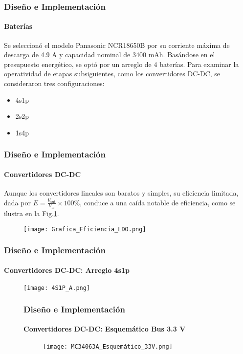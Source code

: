 \begin{frame}
    \frametitle{Diseño e Implementación}
    \framesubtitle{Baterías}
    Se seleccionó el modelo Panasonic NCR18650B por su corriente máxima de descarga de 4.9 A y capacidad nominal de 3400 mAh. Basándose en el presupuesto energético, se optó por un arreglo de 4 baterías. Para examinar la operatividad de etapas subsiguientes, como los convertidores DC-DC, se consideraron tres configuraciones: 
    \begin{itemize}
        \item 4s1p
        \item 2s2p
        \item 1s4p
    \end{itemize}
\end{frame}

\begin{frame}
    \frametitle{Diseño e Implementación}
    \framesubtitle{Convertidores DC-DC}
    Aunque los convertidores lineales son baratos y simples, su eficiencia limitada, dada por $E = \frac{V_{\text{out}}}{V_{\text{in}}} \times 100\%$, conduce a una caída notable de eficiencia, como se ilustra en la Fig.\ref{fig:LDOE}.
    \begin{figure}[H]
        \centering
        \texttt{[image: Grafica\_Eficiencia\_LDO.png]} %
        \label{fig:LDOE}
    \end{figure}
\end{frame}





\begin{frame}
    \frametitle{Diseño e Implementación}
    \framesubtitle{Convertidores DC-DC: Arreglo 4s1p}
    \begin{figure}[H]
        \centering
        \texttt{[image: 4S1P\_A.png]} %
        \label{fig:4S1P_A}
    \end{figure}
\end{frame}


\begin{figure}
    \frametitle{Diseño e Implementación}
    \framesubtitle{Convertidores DC-DC: Esquemático Bus 3.3 V}
    \begin{figure}[H]
        \centering
        \texttt{[image: MC34063A\_Esquemático\_33V.png]} %
        \label{fig:Resultado3.3}
    \end{figure}
\end{figure}


